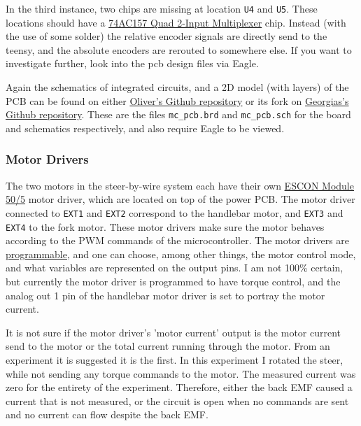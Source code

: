 In the third instance, two chips are missing at location \texttt{U4} and \texttt{U5}.
These locations should have a \href{https://media.digikey.com/pdf/Data%20Sheets/Fairchild%20PDFs/74AC157,%2074ACT157.pdf}{74AC157 Quad 2-Input Multiplexer} chip.
Instead (with the use of some solder) the relative encoder signals are directly send to the teensy, and the absolute encoders are rerouted to somewhere else.
If you want to investigate further, look into the pcb design files via Eagle.

Again the schematics of integrated circuits, and a 2D model (with layers) of the PCB can be found on either \href{https://github.com/oliverlee/gyropcb}{Oliver's Github repository} or its fork on \href{https://github.com/gdialynas/gyropcb}{Georgias's Github repository}.
These are the files \texttt{mc\_pcb.brd} and \texttt{mc\_pcb.sch} for the board and schematics respectively, and also require Eagle to be viewed.

\subsubsection{Motor Drivers} \label{sec:motor_drivers}
The two motors in the steer-by-wire system each have their own \href{https://www.maxongroup.com/maxon/view/product/control/4-Q-Servokontroller/438725}{ESCON Module 50/5} motor driver, which are located on top of the power PCB.
The motor driver connected to \texttt{EXT1} and \texttt{EXT2} correspond to the handlebar motor, and \texttt{EXT3} and \texttt{EXT4} to the fork motor.
These motor drivers make sure the motor behaves according to the PWM commands of the microcontroller.
The motor drivers are \href{https://www.youtube.com/watch?v=-TC_ccQnk-Y&list=PLZXUEi3qPF8XuMxMWy3hmKjp807U61QaZ&index=6}{programmable}, and one can choose, among other things, the motor control mode, and what variables are represented on the output pins.
I am not 100\% certain, but currently the motor driver is programmed to have torque control, and the analog out 1 pin of the handlebar motor driver is set to portray the motor current.

It is not sure if the motor driver's 'motor current' output is the motor current send to the motor or the total current running through the motor.
From an experiment it is suggested it is the first.
In this experiment I rotated the steer, while not sending any torque commands to the motor. 
The measured current was zero for the entirety of the experiment.
Therefore, either the back EMF caused a current that is not measured, or the circuit is open when no commands are sent and no current can flow despite the back EMF.

